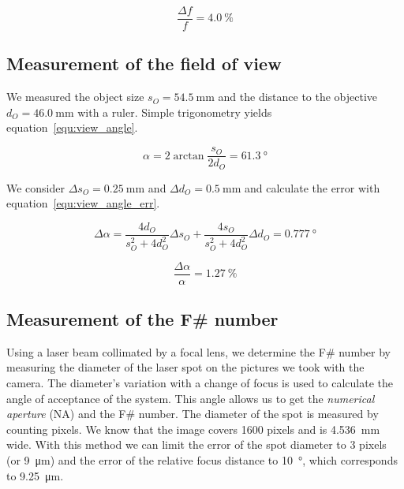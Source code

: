 \documentclass[a4paper, 12pt]{paper}
\begin{document}
\begin{equation}
    \frac{\Delta f}{f} = \SI{4.0}{\percent}
    \label{equ:focal_length_err_percent}
\end{equation}

\subsection{Measurement of the field of view}
We measured the object size $s_O = \SI{54.5}{\milli\meter}$ and the distance to the objective $d_O = \SI{46.0}{\milli\meter}$ with a ruler.
Simple trigonometry yields equation~\ref{equ:view_angle}.

\begin{equation}
    \alpha = 2 \arctan{\frac{s_O}{2 d_O}} = \SI{61.3}{\degree}
    \label{equ:view_angle}
\end{equation}

We consider $\Delta s_O = \SI{0.25}{\milli\meter}$ and $\Delta d_O = \SI{0.5}{\milli\meter}$ and calculate the error with equation~\ref{equ:view_angle_err}.

\begin{equation}
    \Delta \alpha = \frac{4 d_O}{s_O^2 + 4 d_O^2} \Delta s_O
    + \frac{4 s_O}{s_O^2 + 4 d_O^2} \Delta d_O = \SI{0.777}{\degree}
    \label{equ:view_angle_err}
\end{equation}

\begin{equation}
    \frac{\Delta \alpha}{\alpha} = \SI{1.27}{\percent}
    \label{equ:view_angle_err_percent}
\end{equation}

\subsection{Measurement of the F\# number}
Using a laser beam collimated by a focal lens, we determine the F\# number by measuring the diameter of the laser spot on the pictures we took with the camera.
The diameter's variation with a change of focus is used to calculate the angle of acceptance of the system.
This angle allows us to get the \emph{numerical aperture} (NA) and the F\# number.
The diameter of the spot is measured by counting pixels.
We know that the image covers 1600 pixels and is \SI{4.536}{\milli\meter} wide.
With this method we can limit the error of the spot diameter to 3 pixels (or \SI{9}{\micro\meter}) and the error of the relative focus distance to \SI{10}{\degree}, which corresponds to \SI{9.25}{\micro\meter}.
\end{document}
